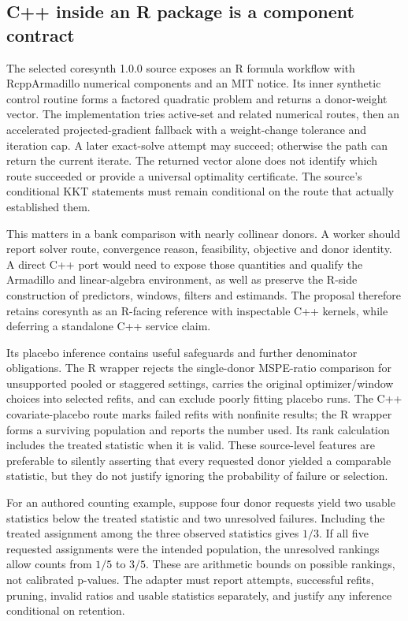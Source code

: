 \subsection{C++ inside an R package is a component contract}
The selected coresynth 1.0.0 source exposes an R formula workflow with
RcppArmadillo numerical components and an MIT notice. Its inner synthetic
control routine forms a factored quadratic problem and returns a donor-weight
vector. The implementation tries active-set and related numerical routes,
then an accelerated projected-gradient fallback with a weight-change
tolerance and iteration cap. A later exact-solve attempt may succeed;
otherwise the path can return the current iterate. The returned vector alone
does not identify which route succeeded or provide a universal optimality
certificate. The source's conditional KKT statements must remain conditional
on the route that actually established them.~\citep{exec25_synthcross_core}

This matters in a bank comparison with nearly collinear donors. A worker
should report solver route, convergence reason, feasibility, objective and
donor identity. A direct C++ port would need to expose those quantities and
qualify the Armadillo and linear-algebra environment, as well as preserve
the R-side construction of predictors, windows, filters and estimands.
The proposal therefore retains coresynth as an R-facing reference with
inspectable C++ kernels, while deferring a standalone C++ service claim.
\citep{exec25_synthcross_core,exec25_synthcross_choice}

Its placebo inference contains useful safeguards and further denominator
obligations. The R wrapper rejects the single-donor MSPE-ratio comparison
for unsupported pooled or staggered settings, carries the original
optimizer/window choices into selected refits, and can exclude poorly
fitting placebo runs. The C++ covariate-placebo route marks failed refits
with nonfinite results; the R wrapper forms a surviving population and
reports the number used. Its rank calculation includes the treated statistic
when it is valid. These source-level features are preferable to silently
asserting that every requested donor yielded a comparable statistic, but
they do not justify ignoring the probability of failure or selection.
\citep{exec25_synthcross_core}

For an authored counting example, suppose four donor requests yield two
usable statistics below the treated statistic and two unresolved failures.
Including the treated assignment among the three observed statistics gives
$1/3$. If all five requested assignments were the intended population,
the unresolved rankings allow counts from $1/5$ to $3/5$. These are arithmetic
bounds on possible rankings, not calibrated p-values. The adapter must
report attempts, successful refits, pruning, invalid ratios and usable
statistics separately, and justify any inference conditional on retention.
\citep{exec25_synthcross_choice}

